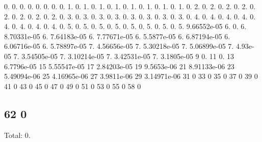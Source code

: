 0. 0. 0. 0. 0. 0. 0. 0. 1. 0. 1. 0. 1. 0. 1. 0. 1. 0. 1. 0. 1. 0. 1. 0. 2. 0. 2. 0. 2. 0. 2. 0. 2. 0. 2. 0. 2. 0. 2. 0. 3. 0. 3. 0. 3. 0. 3. 0. 3. 0. 3. 0. 3. 0. 3. 0. 4. 0. 4. 0. 4. 0. 4. 0. 4. 0. 4. 0. 4. 0. 4. 0. 5. 0. 5. 0. 5. 0. 5. 0. 5. 0. 5. 0. 5. 0. 5. 9.\+66552e-\/05 6. 0. 6. 8.\+70331e-\/05 6. 7.\+64183e-\/05 6. 7.\+77671e-\/05 6. 5.\+5877e-\/05 6. 6.\+87194e-\/05 6. 6.\+06716e-\/05 6. 5.\+78897e-\/05 7. 4.\+56656e-\/05 7. 5.\+30218e-\/05 7. 5.\+06899e-\/05 7. 4.\+93e-\/05 7. 3.\+54505e-\/05 7. 3.\+10214e-\/05 7. 3.\+42531e-\/05 7. 3.\+1805e-\/05 9 0. 11 0. 13 6.\+7796e-\/05 15 5.\+55547e-\/05 17 2.\+84203e-\/05 19 9.\+5653e-\/06 21 8.\+91133e-\/06 23 5.\+49094e-\/06 25 4.\+16965e-\/06 27 3.\+9811e-\/06 29 3.\+14971e-\/06 31 0 33 0 35 0 37 0 39 0 41 0 43 0 45 0 47 0 49 0 51 0 53 0 55 0 58 0 \subsection*{62 0 }

Total\+: 0. 